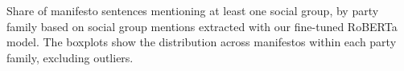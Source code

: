 Share of manifesto sentences mentioning at least one social group, by party family based on social group mentions extracted with our fine-tuned RoBERTa model. The boxplots show the distribution across manifestos within each party family, excluding outliers.